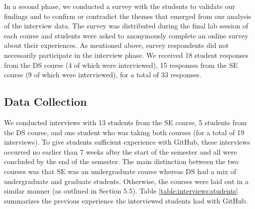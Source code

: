 In a second phase, we conducted a survey with the students to validate our findings and to confirm or contradict the themes that emerged from our analysis of the  interview data. The survey was distributed during the final lab session of each course and students were asked to anonymously complete an online survey about their experiences. As mentioned above, survey respondents did not necessarily participate in the interview phase. We received 18 student responses from the DS course (4 of which were interviewed), 15 responses  from the SE course (9 of which were interviewed), for a total of 33 responses.

\subsection{Data Collection}
We conducted interviews with 13 students from the SE course, 5 students from the DS course, and one student who was taking both courses (for a total of 19 interviews). 
To give students sufficient experience with GitHub, these interviews occurred no earlier than 7 weeks after the start of the semester and all were concluded by the end of the semester.
 The main distinction between the two courses was that SE was an undergraduate course whereas DS had a mix of undergraduate and graduate students. Otherwise, the courses were laid out in a similar manner (as outlined in Section 5.5). Table \ref{table:interviews:students} summarizes the previous experience the interviewed students had with GitHub. 

